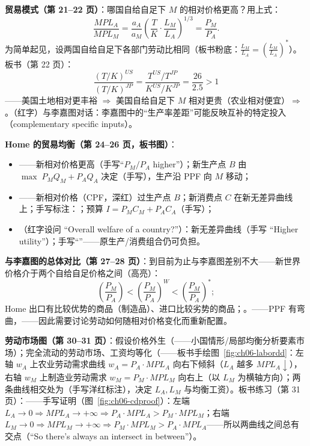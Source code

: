 \textbf{贸易模式（第 21--22 页）}：哪国自给自足下 $M$ 的相对价格更高？用上式：
\[
\frac{MPL_A}{MPL_M} = \frac{a_A}{a_M}\left( \frac{T}{K} \cdot \frac{L_M}{L_A} \right)^{1/3} = \frac{P_M}{P_A}.
\]
为简单起见，设两国自给自足下各部门劳动比相同（板书粉底：$\frac{L_M}{L_A} = \left( \frac{L_M}{L_A} \right)^{*}$）。板书（第 22 页）：
\[
\frac{(T/K)^{US}}{(T/K)^{JP}} = \frac{T^{US}/T^{JP}}{K^{US}/K^{JP}} = \frac{26}{2.5} > 1
\]
——美国土地相对更丰裕 $\Rightarrow$ 美国自给自足下 $M$ 相对更贵（农业相对便宜）$\Rightarrow$ 。（红字）与李嘉图对话：李嘉图中的``生产率差距''可能反映互补的特定投入（complementary specific inputs）。


\textbf{Home 的贸易均衡（第 24--26 页，板书图）}：
\begin{itemize}
  \item {}——新相对价格更高（手写``$P_M/P_A$ higher''）；新生产点 $B$ 由 $\max\; P_M Q_M + P_A Q_A$ 决定（手写），生产沿 PPF 向 $M$ 移动；
  \item {}——新相对价格（CPF，深红）过生产点 $B$；新消费点 $C$ 在新无差异曲线上；手写标注：；预算 $I = P_M C_M + P_A C_A$（手写）；
  \item {}（红字设问 ``Overall welfare of a country?''）：新无差异曲线（手写 ``Higher utility''）；手写``''——原生产/消费组合仍可负担。
\end{itemize}

\textbf{与李嘉图的总体对比（第 27--28 页）}：到目前为止与李嘉图差别不大——新世界价格介于两个自给自足价格之间（高亮）：
\[
\left( \frac{P_M}{P_A} \right) < \left( \frac{P_M}{P_A} \right)^{W} < \left( \frac{P_M}{P_A} \right)^{*};
\]
Home 出口有比较优势的商品（制造品）、进口比较劣势的商品；。——PPF 有弯曲，——因此需要讨论劳动如何随相对价格变化而重新配置。


\textbf{劳动市场图（第 30--31 页）}：假设价格外生（——小国情形/局部均衡分析要素市场）；完全流动的劳动市场、工资均等化（——板书手绘图~\ref{fig:ch06-labordd}：左轴 $w_A$ 上农业劳动需求曲线 $w_A = P_A \cdot MPL_A$ 向右下倾斜（$L_A$ 越多 $MPL_A \downarrow$），右轴 $w_M$ 上制造业劳动需求 $w_M = P_M \cdot MPL_M$ 向右上（以 $L_M$ 为横轴方向）；两条曲线相交处为（手写洋红标注），决定 $L_A, L_M$ 与均衡工资）。板书练习（第 31 页）：——手写证明（图~\ref{fig:ch06-cdproof}）：左端 $L_A \to 0 \Rightarrow MPL_A \to +\infty \Rightarrow P_A \cdot MPL_A > P_M \cdot MPL_M$；右端 $L_M \to 0 \Rightarrow MPL_M \to +\infty \Rightarrow P_M \cdot MPL_M > P_A \cdot MPL_A$——所以两曲线之间总有交点（``So there's always an intersect in between''）。

